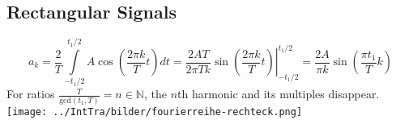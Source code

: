     \subsection{Rectangular Signals}
    $$a_k=\frac{2}{T}\int\limits_{-t_1/2}^{t_1/2}A\cos\left(\frac{2\pi k}{T}t\right)dt=
    \left .\frac{2AT}{2\pi T k}\sin \left(\frac{2\pi k}{T}t\right)\right |_{-t_1/2}^{t_1/2}=
    \frac{2A}{\pi k}\sin\left(\frac{\pi t_1}{T}k\right)$$
    For ratios $\frac{T}{\text{gcd}(t_1,T)}=n\in\mathbb{N}$, the
    $n$th harmonic and its multiples disappear.\\
    \texttt{[image: ../IntTra/bilder/fourierreihe-rechteck.png]}
